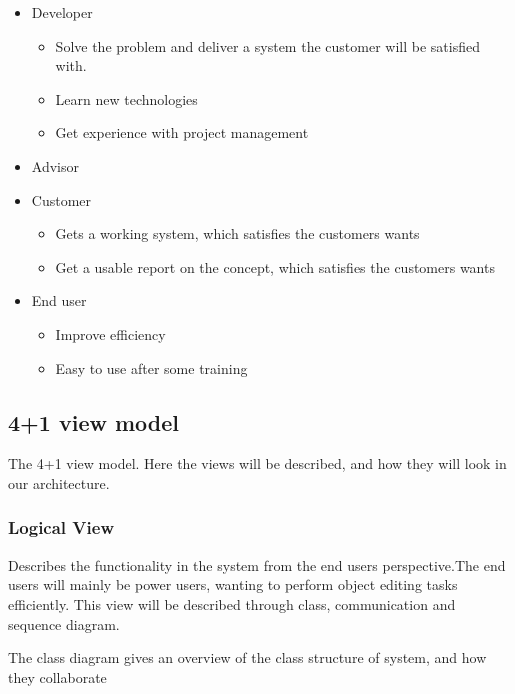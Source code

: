 \begin{itemize}{labelitemi}{$\bullet$}
    \item Developer
    \begin{itemize}{labelitemi}{$\bullet$}
        \item Solve the problem and deliver a system the customer will be satisfied with.
        \item Learn new technologies
        \item Get experience with project management
        \end{itemize}
    \item Advisor
    \item Customer
    \begin{itemize}{labelitemi}{$\bullet$}
        \item Gets a working system, which satisfies the customers wants
        \item Get a usable report on the concept, which satisfies the customers wants
    \end{itemize}
    \item End user
    \begin{itemize}{labelitemi}{$\bullet$}
        \item Improve efficiency
        \item Easy to use after some training
    \end{itemize}
\end{itemize}



\subsection{4+1 view model}
The 4+1 view model. Here the views will be described, and how they will look in our architecture. 

\subsubsection{Logical View}
Describes the functionality in the system from the end users perspective.The end users will mainly be power users, wanting to perform object editing tasks efficiently. This view will be described through class, communication and sequence diagram.

The class diagram gives an overview of the class structure of system, and how they collaborate

